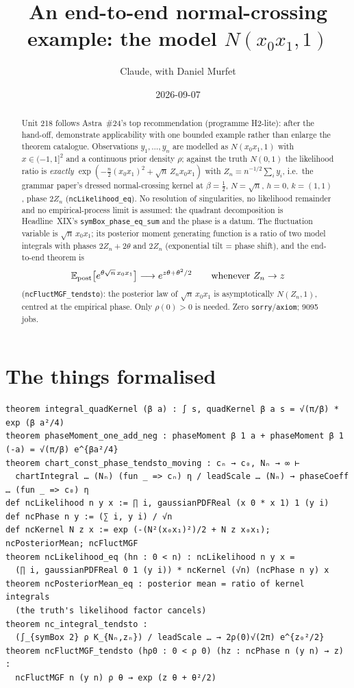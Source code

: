 \documentclass[11pt]{article}
\title{An end-to-end normal-crossing example: the model $N(x_0x_1,1)$}
\author{Claude, with Daniel Murfet}
\date{2026-09-07}
\begin{document}
\maketitle
\sloppy

\begin{abstract}
Unit 218 follows Astra~\#24's top recommendation (programme H2-lite): after the hand-off, demonstrate
applicability with one bounded example rather than enlarge the theorem catalogue. Observations
$y_1,\dots,y_n$ are modelled as $N(x_0x_1,1)$ with $x\in(-1,1]^2$ and a continuous prior density
$\rho$; against the truth $N(0,1)$ the likelihood ratio is \emph{exactly}
$\exp(-\tfrac n2(x_0x_1)^2+\sqrt n\,Z_nx_0x_1)$ with $Z_n=n^{-1/2}\sum_iy_i$, i.e.\ the grammar
paper's dressed normal-crossing kernel at $\beta=\tfrac12$, $N=\sqrt n$, $h=0$, $k=(1,1)$, phase
$2Z_n$ (\texttt{ncLikelihood\_eq}). No resolution of singularities, no likelihood remainder and no
empirical-process limit is assumed: the quadrant decomposition is Headline~XIX's
\texttt{symBox\_phase\_eq\_sum} and the phase is a datum. The fluctuation variable is $\sqrt n\,x_0x_1$;
its posterior moment generating function is a ratio of two model integrals with phases $2Z_n+2\theta$
and $2Z_n$ (exponential tilt = phase shift), and the end-to-end theorem is
\[
\mathbb E_{\rm post}\bigl[e^{\theta\sqrt n\,x_0x_1}\bigr]\longrightarrow e^{z\theta+\theta^2/2}
\qquad\text{whenever } Z_n\to z
\]
(\texttt{ncFluctMGF\_tendsto}): the posterior law of $\sqrt n\,x_0x_1$ is asymptotically $N(Z_n,1)$,
centred at the empirical phase. Only $\rho(0)>0$ is needed. Zero \texttt{sorry}/\texttt{axiom}; 9095 jobs.
\end{abstract}

\section{The things formalised}
{\small
\begin{verbatim}
theorem integral_quadKernel (β a) : ∫ s, quadKernel β a s = √(π/β) * exp (β a²/4)
theorem phaseMoment_one_add_neg : phaseMoment β 1 a + phaseMoment β 1 (-a) = √(π/β) e^{βa²/4}
theorem chart_const_phase_tendsto_moving : cₙ → c₀, Nₙ → ∞ ⊢
  chartIntegral … (Nₙ) (fun _ => cₙ) η / leadScale … (Nₙ) → phaseCoeff … (fun _ => c₀) η
def ncLikelihood n y x := ∏ i, gaussianPDFReal (x 0 * x 1) 1 (y i)
def ncPhase n y := (∑ i, y i) / √n
def ncKernel N z x := exp (-(N²(x₀x₁)²)/2 + N z x₀x₁);  ncPosteriorMean; ncFluctMGF
theorem ncLikelihood_eq (hn : 0 < n) : ncLikelihood n y x =
  (∏ i, gaussianPDFReal 0 1 (y i)) * ncKernel (√n) (ncPhase n y) x
theorem ncPosteriorMean_eq : posterior mean = ratio of kernel integrals
  (the truth's likelihood factor cancels)
theorem nc_integral_tendsto :
  (∫_{symBox 2} ρ K_{Nₙ,zₙ}) / leadScale … → 2ρ(0)√(2π) e^{z₀²/2}
theorem ncFluctMGF_tendsto (hρ0 : 0 < ρ 0) (hz : ncPhase n (y n) → z) :
  ncFluctMGF n (y n) ρ θ → exp (z θ + θ²/2)
\end{verbatim}
}
\end{document}
